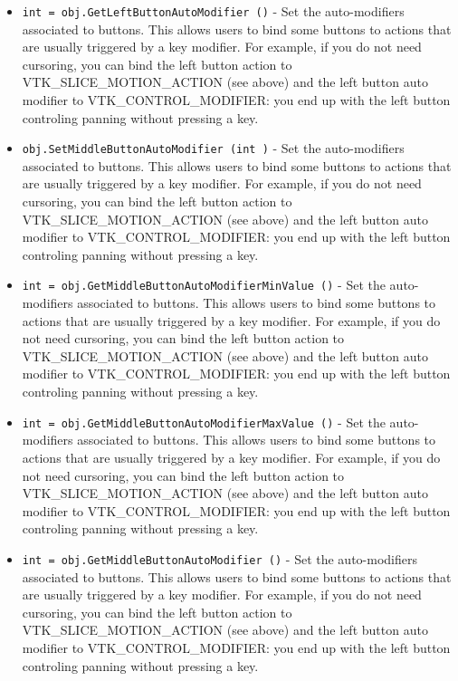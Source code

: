 \begin{itemize}
\item  \verb|int = obj.GetLeftButtonAutoModifier ()| -  Set the auto-modifiers associated to buttons.
 This allows users to bind some buttons to actions that are usually
 triggered by a key modifier. For example, if you do not need cursoring,
 you can bind the left button action to VTK\_SLICE\_MOTION\_ACTION (see above) 
 and the left button auto modifier to VTK\_CONTROL\_MODIFIER: you end up with
 the left button controling panning without pressing a key.

\item  \verb|obj.SetMiddleButtonAutoModifier (int )| -  Set the auto-modifiers associated to buttons.
 This allows users to bind some buttons to actions that are usually
 triggered by a key modifier. For example, if you do not need cursoring,
 you can bind the left button action to VTK\_SLICE\_MOTION\_ACTION (see above) 
 and the left button auto modifier to VTK\_CONTROL\_MODIFIER: you end up with
 the left button controling panning without pressing a key.

\item  \verb|int = obj.GetMiddleButtonAutoModifierMinValue ()| -  Set the auto-modifiers associated to buttons.
 This allows users to bind some buttons to actions that are usually
 triggered by a key modifier. For example, if you do not need cursoring,
 you can bind the left button action to VTK\_SLICE\_MOTION\_ACTION (see above) 
 and the left button auto modifier to VTK\_CONTROL\_MODIFIER: you end up with
 the left button controling panning without pressing a key.

\item  \verb|int = obj.GetMiddleButtonAutoModifierMaxValue ()| -  Set the auto-modifiers associated to buttons.
 This allows users to bind some buttons to actions that are usually
 triggered by a key modifier. For example, if you do not need cursoring,
 you can bind the left button action to VTK\_SLICE\_MOTION\_ACTION (see above) 
 and the left button auto modifier to VTK\_CONTROL\_MODIFIER: you end up with
 the left button controling panning without pressing a key.

\item  \verb|int = obj.GetMiddleButtonAutoModifier ()| -  Set the auto-modifiers associated to buttons.
 This allows users to bind some buttons to actions that are usually
 triggered by a key modifier. For example, if you do not need cursoring,
 you can bind the left button action to VTK\_SLICE\_MOTION\_ACTION (see above) 
 and the left button auto modifier to VTK\_CONTROL\_MODIFIER: you end up with
 the left button controling panning without pressing a key.


\end{itemize}
